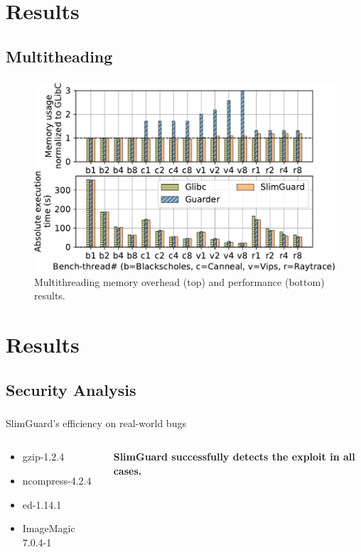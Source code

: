 \documentclass{beamer}
\begin{document}
\section{Results}
\subsection{Multitheading}
\begin{frame}
		\frametitle{\secname}
    \framesubtitle{\subsecname}
    \begin{figure}
      \centering
      \includegraphics[scale=0.6]{multithreading.pdf}
      \\Multithreading memory overhead (top) and performance (bottom)
      results.

    \end{figure}
\end{frame}

\section{Results}
\subsection{Security Analysis}
\begin{frame}
    \frametitle{\secname}
    \framesubtitle{\subsecname}
    SlimGuard's efficiency on real-world bugs
    \begin{columns}
       \begin{column}{0.5\textwidth}
            \begin{itemize}
                \item gzip-1.2.4
                \item ncompress-4.2.4
                \item ed-1.14.1
                \item ImageMagic 7.0.4-1
            \end{itemize}
       \end{column}

       \begin{column}{0.5\textwidth}
           \textbf{SlimGuard successfully detects the exploit in all cases.}

       \end{column}
    \end{columns}

\end{frame}
\end{document}
